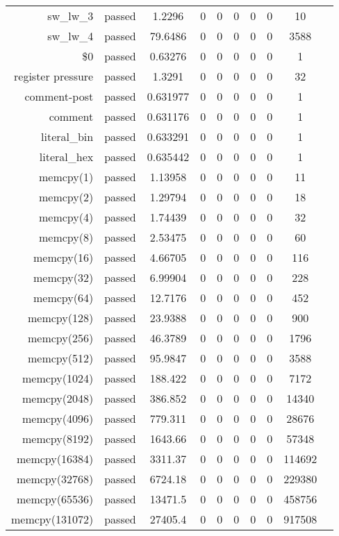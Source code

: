 \begin{longtable}{r|ccccccccc}
    sw\_lw\_3 & passed & 1.2296 & 0 & 0 & 0 & 0 & 0 & 10 \\
    sw\_lw\_4 & passed & 79.6486 & 0 & 0 & 0 & 0 & 0 & 3588 \\
    \$0 & passed & 0.63276 & 0 & 0 & 0 & 0 & 0 & 1 \\
    register pressure & passed & 1.3291 & 0 & 0 & 0 & 0 & 0 & 32 \\
    comment-post & passed & 0.631977 & 0 & 0 & 0 & 0 & 0 & 1 \\
    comment & passed & 0.631176 & 0 & 0 & 0 & 0 & 0 & 1 \\
    literal\_bin & passed & 0.633291 & 0 & 0 & 0 & 0 & 0 & 1 \\
    literal\_hex & passed & 0.635442 & 0 & 0 & 0 & 0 & 0 & 1 \\
    memcpy(1) & passed & 1.13958 & 0 & 0 & 0 & 0 & 0 & 11 \\
    memcpy(2) & passed & 1.29794 & 0 & 0 & 0 & 0 & 0 & 18 \\
    memcpy(4) & passed & 1.74439 & 0 & 0 & 0 & 0 & 0 & 32 \\
    memcpy(8) & passed & 2.53475 & 0 & 0 & 0 & 0 & 0 & 60 \\
    memcpy(16) & passed & 4.66705 & 0 & 0 & 0 & 0 & 0 & 116 \\
    memcpy(32) & passed & 6.99904 & 0 & 0 & 0 & 0 & 0 & 228 \\
    memcpy(64) & passed & 12.7176 & 0 & 0 & 0 & 0 & 0 & 452 \\
    memcpy(128) & passed & 23.9388 & 0 & 0 & 0 & 0 & 0 & 900 \\
    memcpy(256) & passed & 46.3789 & 0 & 0 & 0 & 0 & 0 & 1796 \\
    memcpy(512) & passed & 95.9847 & 0 & 0 & 0 & 0 & 0 & 3588 \\
    memcpy(1024) & passed & 188.422 & 0 & 0 & 0 & 0 & 0 & 7172 \\
    memcpy(2048) & passed & 386.852 & 0 & 0 & 0 & 0 & 0 & 14340 \\
    memcpy(4096) & passed & 779.311 & 0 & 0 & 0 & 0 & 0 & 28676 \\
    memcpy(8192) & passed & 1643.66 & 0 & 0 & 0 & 0 & 0 & 57348 \\
    memcpy(16384) & passed & 3311.37 & 0 & 0 & 0 & 0 & 0 & 114692 \\
    memcpy(32768) & passed & 6724.18 & 0 & 0 & 0 & 0 & 0 & 229380 \\
    memcpy(65536) & passed & 13471.5 & 0 & 0 & 0 & 0 & 0 & 458756 \\
    memcpy(131072) & passed & 27405.4 & 0 & 0 & 0 & 0 & 0 & 917508 \\

\end{longtable}
